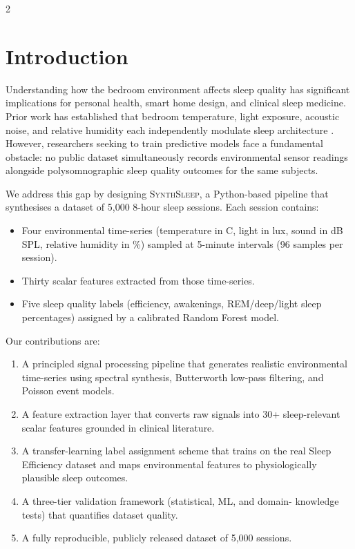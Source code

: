 \documentclass[11pt,a4paper]{article}
\newcommand{\ourmethod}{\textsc{SynthSleep}}
\begin{document}
\vspace{6pt}
\begin{multicols}{2}

\section{Introduction}

Understanding how the bedroom environment affects sleep quality has significant
implications for personal health, smart home design, and clinical sleep
medicine.  Prior work has established that bedroom temperature, light exposure,
acoustic noise, and relative humidity each independently modulate sleep
architecture \cite{okamoto2012thermal,zeitzer2000sensitivity,who2009noise}.
However, researchers seeking to train predictive models face a fundamental
obstacle: no public dataset simultaneously records environmental sensor
readings alongside polysomnographic sleep quality outcomes for the same
subjects.

We address this gap by designing \ourmethod{}, a Python-based pipeline that
synthesises a dataset of 5,000 8-hour sleep sessions.  Each session contains:

\begin{itemize}\setlength\itemsep{0pt}
  \item Four environmental time-series (temperature in \textdegree C, light in
        lux, sound in dB SPL, relative humidity in \%) sampled at 5-minute
        intervals (96 samples per session).
  \item Thirty scalar features extracted from those time-series.
  \item Five sleep quality labels (efficiency, awakenings, REM/deep/light
        sleep percentages) assigned by a calibrated Random Forest model.
\end{itemize}

Our contributions are:
\begin{enumerate}\setlength\itemsep{0pt}
  \item A principled signal processing pipeline that generates realistic
        environmental time-series using spectral synthesis, Butterworth
        low-pass filtering, and Poisson event models.
  \item A feature extraction layer that converts raw signals into 30+
        sleep-relevant scalar features grounded in clinical literature.
  \item A transfer-learning label assignment scheme that trains on the
        real Sleep Efficiency dataset and maps environmental features to
        physiologically plausible sleep outcomes.
  \item A three-tier validation framework (statistical, ML, and domain-
        knowledge tests) that quantifies dataset quality.
  \item A fully reproducible, publicly released dataset of 5,000 sessions.
\end{enumerate}


\end{multicols}
\end{document}
